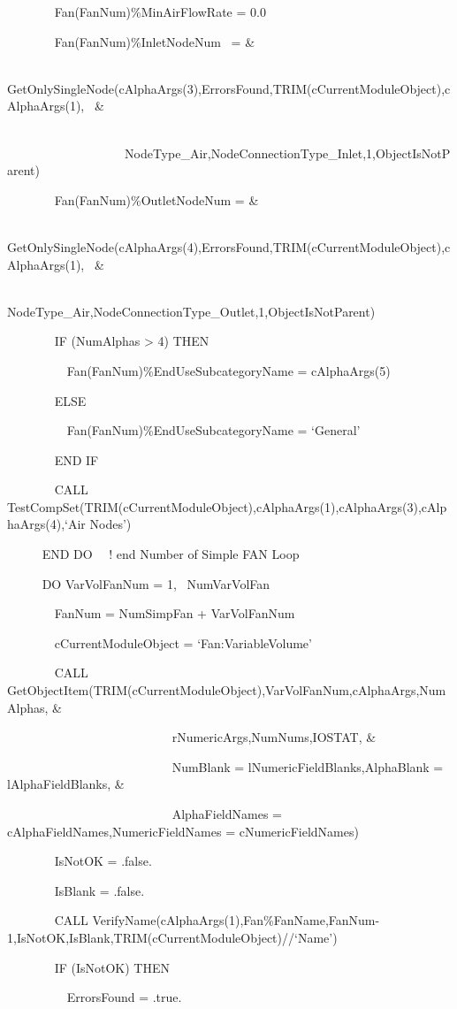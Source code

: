 ~~~~~~~ Fan(FanNum)\%MinAirFlowRate = 0.0

~~~~~~~ Fan(FanNum)\%InletNodeNum~ = \&

~~~~~~~~~~~~~~ GetOnlySingleNode(cAlphaArgs(3),ErrorsFound,TRIM(cCurrentModuleObject),cAlphaArgs(1),~ \&

~~~~~~~~ ~~~~~~~~~~~~~~~~~~~NodeType\_Air,NodeConnectionType\_Inlet,1,ObjectIsNotParent)

~~~~~~~ Fan(FanNum)\%OutletNodeNum = \&

~~~~~~~~~~~~~~ GetOnlySingleNode(cAlphaArgs(4),ErrorsFound,TRIM(cCurrentModuleObject),cAlphaArgs(1),~ \&

~~~~~~~~~~~~~~~~~~~~~~~~~~~ NodeType\_Air,NodeConnectionType\_Outlet,1,ObjectIsNotParent)

~~~~~~~ IF (NumAlphas \textgreater{} 4) THEN

~~~~~~~~~ Fan(FanNum)\%EndUseSubcategoryName = cAlphaArgs(5)

~~~~~~~ ELSE

~~~~~~~~~ Fan(FanNum)\%EndUseSubcategoryName = `General'

~~~~~~~ END IF

~~~~~~~ CALL TestCompSet(TRIM(cCurrentModuleObject),cAlphaArgs(1),cAlphaArgs(3),cAlphaArgs(4),`Air Nodes')

~~~~~ END DO~~ ! end Number of Simple FAN Loop

~~~~~ DO VarVolFanNum = 1,~ NumVarVolFan

~~~~~~~ FanNum = NumSimpFan + VarVolFanNum

~~~~~~~ cCurrentModuleObject = `Fan:VariableVolume'

~~~~~~~ CALL GetObjectItem(TRIM(cCurrentModuleObject),VarVolFanNum,cAlphaArgs,NumAlphas, \&

~~~~~~~~~~~~~~~~~~~~~~~~~~ rNumericArgs,NumNums,IOSTAT, \&

~~~~~~~~~~~~~~~~~~~~~~~~~~ NumBlank = lNumericFieldBlanks,AlphaBlank = lAlphaFieldBlanks, \&

~~~~~~~~~~~~~~~~~~~~~~~~~~ AlphaFieldNames = cAlphaFieldNames,NumericFieldNames = cNumericFieldNames)

~~~~~~~ IsNotOK = .false.

~~~~~~~ IsBlank = .false.

~~~~~~~ CALL VerifyName(cAlphaArgs(1),Fan\%FanName,FanNum-1,IsNotOK,IsBlank,TRIM(cCurrentModuleObject)//`Name')

~~~~~~~ IF (IsNotOK) THEN

~~~~~~~~~ ErrorsFound = .true.

